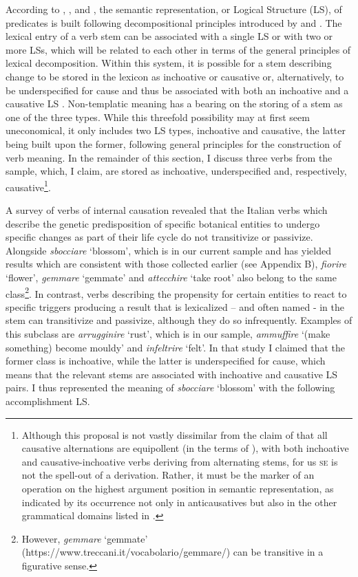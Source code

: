 \documentclass[output=paper,colorlinks,citecolor=brown
]{langscibook}
\begin{document}
According to \citet[82—129]{vanvalin1997syntax}, \citet[32—49]{vanvalin2005exploring}, and \citet[94—107]{vanvalin2023principles}, the semantic representation, or Logical Structure (LS), of predicates is built following decompositional principles introduced by \citet{vendler1967linguistics} and \citet{dowty1979word}. The lexical entry of a verb stem can be associated with a single LS or with two or more LSs, which will be related to each other in terms of the general principles of lexical decomposition. Within this system, it is possible for a stem describing change to be stored in the lexicon as inchoative or causative or, alternatively, to be underspecified for cause and thus be associated with both an inchoative and a causative LS \citep{brocher2017full}. Non-templatic meaning has a bearing on the storing of a stem as one of the three types. While this threefold possibility may at first seem uneconomical, it only includes two LS types, inchoative and causative, the latter being built upon the former, following general principles for the construction of verb meaning. In the remainder of this section, I discuss three verbs from the sample, which, I claim, are stored as inchoative, underspecified and, respectively, causative\footnote{Although this proposal is not vastly dissimilar from the claim of \citet{pinon2001finer} that all causative alternations are equipollent (in the terms of \cite{haspelmath1993more}), with both inchoative and causative-inchoative verbs deriving from alternating stems, for us \textsc{se} is not the spell-out of a derivation. Rather, it must be the marker of an operation on the highest argument position in semantic representation, as indicated by its occurrence not only in anticausatives but also in the other grammatical domains listed in .}.

A survey of verbs of internal causation \citep{bentley2023internally} revealed that the Italian verbs which describe the genetic predisposition of specific botanical entities to undergo specific changes as part of their life cycle do not transitivize or passivize. Alongside \textit{sbocciare} ‘blossom’, which is in our current sample and has yielded results which are consistent with those collected earlier (see Appendix B), \textit{fiorire} ‘flower’, \textit{gemmare} ‘gemmate’ and \textit{attecchire} ‘take root’ also belong to the same class\footnote{However, \textit{gemmare} ‘gemmate’ (https://www.treccani.it/vocabolario/gemmare/) can be transitive in a figurative sense.}.   In contrast, verbs describing the propensity for certain entities to react to specific triggers producing a result that is lexicalized – and often named - in the stem can transitivize and passivize, although they do so infrequently. Examples of this subclass are \textit{arrugginire} ‘rust’, which is in our sample, \textit{ammuffire} ‘(make something) become mouldy’ and \textit{infeltrire} ‘felt’. In that study I claimed that the former class is inchoative, while the latter is underspecified for cause, which means that the relevant stems are associated with inchoative and causative LS pairs. I thus represented the meaning of \textit{sbocciare} ‘blossom’ with the following accomplishment LS. 
\end{document}

